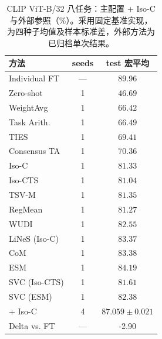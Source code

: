 \begin{table}[!htbp]
\centering\small
\caption{CLIP ViT-B/32 八任务：主配置 \method{} + Iso-C 与外部参照（\%）。采用固定基准实现，\method{} 为四种子均值及样本标准差，外部方法为已归档单次结果。}
\label{tab:clip-main}
\begin{tabular}{@{}lcc@{}}
\toprule
方法 & seeds & test 宏平均 \\
\midrule
Individual FT & --- & 89.96 \\
Zero-shot & 1 & $46.69$ \\
WeightAvg & 1 & $66.42$ \\
Task Arith. & 1 & $66.49$ \\
TIES & 1 & $69.41$ \\
Consensus TA & 1 & $70.36$ \\
Iso-C & 1 & $81.33$ \\
Iso-CTS & 1 & $81.04$ \\
TSV-M & 1 & $81.35$ \\
RegMean & 1 & $81.27$ \\
WUDI & 1 & $82.55$ \\
LiNeS (Iso-C) & 1 & $83.37$ \\
CoM & 1 & $83.38$ \\
ESM & 1 & $84.19$ \\
SVC (Iso-CTS) & 1 & $81.61$ \\
SVC (ESM) & 1 & $82.38$ \\
\rowcolor{black!8}
\method{} + Iso-C & 4 & $87.059\pm 0.021$ \\
Delta vs. FT & --- & -2.90 \\
\bottomrule
\end{tabular}
\end{table}
